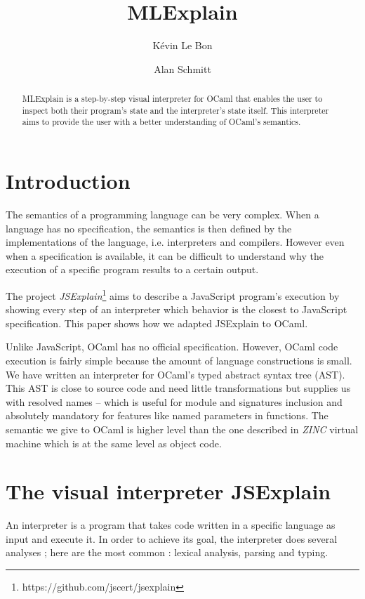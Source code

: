 \documentclass[twocolumn]{article}
\author{
	K\'evin Le Bon
	\and
	Alan Schmitt
}
\title{MLExplain}
\begin{document}
\maketitle

\begin{abstract}
	MLExplain is a step-by-step visual interpreter for OCaml that enables the user
	to inspect both their program's state and the interpreter's state itself. This interpreter
	aims to provide the user with a better understanding of OCaml's semantics.
\end{abstract}

\section{Introduction}

The semantics of a programming language can be very complex. When a language has no specification,
the semantics is then defined by the implementations of the language, i.e. interpreters and
compilers. However even when a specification is available, it can be difficult to understand why
the execution of a specific program results to a certain output.

The project \emph{JSExplain}\footnote{https://github.com/jscert/jsexplain} aims to describe
a JavaScript program's execution by showing every step of an interpreter which behavior is the
closest to JavaScript specification. This paper shows how we adapted JSExplain to OCaml.

Unlike JavaScript, OCaml has no official specification. However, OCaml code execution is
fairly simple because the amount of language constructions is small. We have written an
interpreter for OCaml's typed abstract syntax tree (AST). This AST is close to source code and
need little transformations but supplies us with resolved names -- which is useful for module and
signatures inclusion and absolutely mandatory for features like named parameters in functions.
The semantic we give to OCaml is higher level than the one described in \emph{ZINC}
\cite{Leroy-ZINC} virtual machine which is at the same level as object code.

\section{The visual interpreter JSExplain}

An interpreter is a program that takes code written in a specific language as input
and execute it. In order to achieve its goal, the interpreter does several analyses ;
here are the most common : lexical analysis, parsing and typing.
\end{document}
